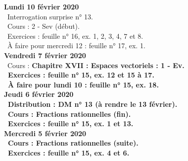 \documentclass[12pt,a4paper]{article}
\begin{document}
%  
%  
% 
\noindent\textbf{\bf Lundi 10 février 2020} \\
\bu\ Interrogation surprise n° 13.\\
\bu\ Cours : 2 - Sev (début).\\
\bu\ Exercices : feuille n° 16, ex. 1, 2, 3, 4, 7 et 8.\\
\bu\ À faire pour mercredi 12 : feuille n° 17, ex. 1.\vspace{.4cm}\\

\noindent\textbf{Vendredi 7 février 2020}\\
\bu\ Cours : \bf Chapitre XVII \rm : Espaces vectoriels : 1 - Ev.\\
\bu\ Exercices : feuille n° 15, ex. 12 et 15 à 17.\\
\bu\ À faire pour lundi 10 : feuille n° 15, ex. 18.\vspace{.4cm}\\
 
\noindent\textbf{Jeudi 6 février 2020}\\
\bu\ Distribution : DM n° 13 (à rendre le 13 février).\\
\bu\ Cours : Fractions rationnelles (fin).\\
\bu\ Exercices : feuille n° 15, ex. 1 et 13.\vspace{.4cm}\\
 
\noindent\textbf{Mercredi 5 février 2020} \\
\bu\ Cours : Fractions rationnelles (suite).\\
\bu\ Exercices : feuille n° 15, ex. 4 et 6.\vspace{.4cm}\\
\end{document}
